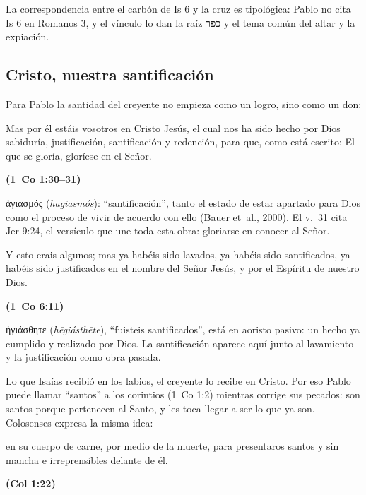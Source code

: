 \documentclass[11pt,letterpaper]{article}
\newcommand{\heb}[1]{\mbox{\foreignlanguage{hebrew}{#1}}}
\newcommand{\grc}[1]{\foreignlanguage{ancientgreek}{#1}}
\newcommand{\fuente}[1]{\par\hfill{\upshape\bfseries\small\textcolor{azul}{#1}}}
\begin{document}
\begin{nota}[Precisión]
La correspondencia entre el carbón de Is 6 y la cruz es tipológica: Pablo no cita Is 6 en Romanos 3, y el vínculo lo dan la raíz \heb{כפר} y el tema común del altar y la expiación.
\end{nota}

\subsection{Cristo, nuestra santificación}
Para Pablo la santidad del creyente no empieza como un logro, sino como un don:

\begin{cita}Mas por él estáis vosotros en Cristo Jesús, el cual nos ha sido hecho por Dios sabiduría, justificación, santificación y redención, para que, como está escrito: El que se gloría, gloríese en el Señor.\fuente{(1~Co 1:30--31)}\end{cita}

\begin{filologia}[1~Co 1:30]
\grc{ἁγιασμός} (\emph{hagiasmós}): ``santificación'', tanto el estado de estar apartado para Dios como el proceso de vivir de acuerdo con ello (Bauer et~al., 2000). El v.~31 cita Jer 9:24, el versículo que une toda esta obra: gloriarse en conocer al Señor.
\end{filologia}

\begin{cita}Y esto erais algunos; mas ya habéis sido lavados, ya habéis sido santificados, ya habéis sido justificados en el nombre del Señor Jesús, y por el Espíritu de nuestro Dios.\fuente{(1~Co 6:11)}\end{cita}

\begin{filologia}[1~Co 6:11]
\grc{ἡγιάσθητε} (\emph{hēgiásthēte}), ``fuisteis santificados'', está en aoristo pasivo: un hecho ya cumplido y realizado por Dios. La santificación aparece aquí junto al lavamiento y la justificación como obra pasada.
\end{filologia}

Lo que Isaías recibió en los labios, el creyente lo recibe en Cristo. Por eso Pablo puede llamar ``santos'' a los corintios (1~Co 1:2) mientras corrige sus pecados: son santos porque pertenecen al Santo, y les toca llegar a ser lo que ya son. Colosenses expresa la misma idea:

\begin{cita}en su cuerpo de carne, por medio de la muerte, para presentaros santos y sin mancha e irreprensibles delante de él.\fuente{(Col 1:22)}\end{cita}
\end{document}
